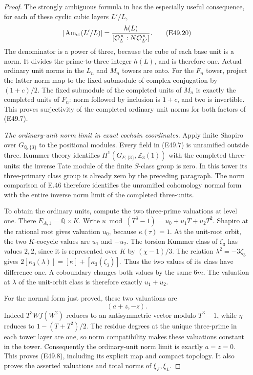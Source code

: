 \begin{proof}
The strongly ambiguous formula
in \cite[Theorem 1, formula (2)]{E_LemmermeyerAmbiguous}
has the especially useful
consequence, for each of these
cyclic cubic layers $L'/L$,
\[
       |\operatorname{Am}_{\rm st}(L'/L)|
         =\frac{h(L)}
                   {[\mathcal O_L^\times:
                         N\mathcal O_{L'}^\times]}.
 \tag{E49.20}
\]
The denominator is a power of
three, because the cube of
each base unit is a norm.
It divides the prime-to-three
integer $h(L)$, and is
therefore one. Actual ordinary
unit norms in the $L_n$ and
$M_n$ towers are onto.
For the $F_n$ tower, project
the latter norm map to the
fixed submodule of complex
conjugation by $(1+c)/2$.
The fixed submodule of the
completed units of $M_n$
is exactly the completed
units of $F_n$: norm followed
by inclusion is $1+c$,
and two is invertible.
This proves surjectivity of
the completed ordinary unit
norms for both factors of
(E49.7).

\emph{The ordinary-unit norm limit in exact cochain coordinates.}
Apply finite Shapiro over
$G_{\mathbb Q,\{3\}}$ to
the positional modules.
Every field in (E49.7)
is unramified outside three.
Kummer theory identifies
$H^1(G_{F,\{3\}},\mathbb Z_3(1))$
with the completed three-units:
the inverse Tate module of
the finite $S$-class group
is zero. In this tower its
three-primary class group
is already zero by the
preceding paragraph. The
norm comparison of E.46
therefore identifies the
unramified cohomology
normal form with the entire
inverse norm limit of the
completed three-units.

To obtain the ordinary units,
compute the two three-prime
valuations at level one.
There $E_{A,1}=\mathbb Q\times K$.
Write $u\bmod(T^3-1)=u_0+u_1T+u_2T^2$.
Shapiro at the rational root
gives valuation $u_0$,
because $\kappa(\tau)=1$.
At the unit-root orbit,
the two $K$-cocycle values
are $u_1$ and $-u_2$.
The torsion Kummer class
of $\zeta_3$ has values
$2,2$, since it is represented
over $K$ by $(\chi-1)/3$.
The relation
$\lambda^2=-3\zeta_3$
gives
$2[\kappa_3(\lambda)]
  =[\kappa]+[\kappa_3(\zeta_3)]$.
Thus the two values of its
class have difference one.
A coboundary changes both
values by the same $6m$.
The valuation at $\lambda$
of the unit-orbit class is
therefore exactly $u_1+u_2$.

For the normal form just
proved, these two valuations
are
\[
                 (a+z,-z).
 \tag{E49.21}
\]
Indeed $T^3W f(W^2)$ reduces
to an antisymmetric vector
modulo $T^3-1$, while
$\eta$ reduces to
$1-(T+T^2)/2$.
The residue degrees at the
unique three-prime in each
tower layer are one, so norm
compatibility makes these
valuations constant in the
tower. Consequently the
ordinary-unit norm limit
is exactly $a=z=0$.
This proves (E49.8), including
its explicit map and compact
topology. It also proves the
asserted valuations and total
norms of $\xi_F,\xi_L$.


\end{proof}
